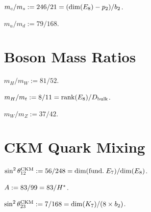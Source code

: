 \begin{definition}[$m_c/m_s$]\label{def:mc_ms}
    \leanok
    $m_c / m_s := 246/21 = (\mathrm{dim}(E_8) - p_2) / b_2$.
\end{definition}

\begin{definition}[$m_u/m_d$]\label{def:mu_md}
    \leanok
    $m_u / m_d := 79/168$.
\end{definition}

\section{Boson Mass Ratios}

\begin{definition}[$m_H/m_W$]\label{def:mH_mW}
    \leanok
    $m_H / m_W := 81/52$.
\end{definition}

\begin{definition}[$m_H/m_t$]\label{def:mH_mt}
    \leanok
    $m_H / m_t := 8/11 = \mathrm{rank}(E_8) / D_{\mathrm{bulk}}$.
\end{definition}

\begin{definition}[$m_W/m_Z$]\label{def:mW_mZ}
    \leanok
    $m_W / m_Z := 37/42$.
\end{definition}

\section{CKM Quark Mixing}

\begin{definition}\label{def:cabibbo}
    \leanok
    $\sin^2\theta_{12}^{\mathrm{CKM}} := 56/248 = \mathrm{dim}(\mathrm{fund.}\; E_7) / \mathrm{dim}(E_8)$.
\end{definition}

\begin{definition}[Wolfenstein $A$]\label{def:A_wolf}
    \leanok
    $A := 83/99 = 83/H^*$.
\end{definition}

\begin{definition}\label{def:theta23_ckm}
    \leanok
    $\sin^2\theta_{23}^{\mathrm{CKM}} := 7/168 = \mathrm{dim}(K_7) / (8 \times b_2)$.
\end{definition}

